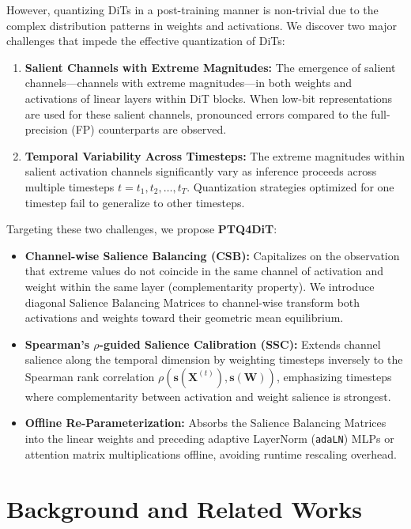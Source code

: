 \documentclass[10pt,a4paper]{article}
\begin{document}
However, quantizing DiTs in a post-training manner is non-trivial due to the complex distribution patterns in weights and activations. We discover two major challenges that impede the effective quantization of DiTs:
\begin{enumerate}
    \item \textbf{Salient Channels with Extreme Magnitudes:} The emergence of salient channels---channels with extreme magnitudes---in both weights and activations of linear layers within DiT blocks. When low-bit representations are used for these salient channels, pronounced errors compared to the full-precision (FP) counterparts are observed.
    \item \textbf{Temporal Variability Across Timesteps:} The extreme magnitudes within salient activation channels significantly vary as inference proceeds across multiple timesteps $t = t_1, t_2, \ldots, t_T$. Quantization strategies optimized for one timestep fail to generalize to other timesteps.
\end{enumerate}

Targeting these two challenges, we propose \textbf{PTQ4DiT}:
\begin{itemize}
    \item \textbf{Channel-wise Salience Balancing (CSB):} Capitalizes on the observation that extreme values do not coincide in the same channel of activation and weight within the same layer (complementarity property). We introduce diagonal Salience Balancing Matrices to channel-wise transform both activations and weights toward their geometric mean equilibrium.
    \item \textbf{Spearman's $\rho$-guided Salience Calibration (SSC):} Extends channel salience along the temporal dimension by weighting timesteps inversely to the Spearman rank correlation $\rho(\mathbf{s}(\mathbf{X}^{(t)}), \mathbf{s}(\mathbf{W}))$, emphasizing timesteps where complementarity between activation and weight salience is strongest.
    \item \textbf{Offline Re-Parameterization:} Absorbs the Salience Balancing Matrices into the linear weights and preceding adaptive LayerNorm (\texttt{adaLN}) MLPs or attention matrix multiplications offline, avoiding runtime rescaling overhead.
\end{itemize}

\section{Background and Related Works}
\end{document}
